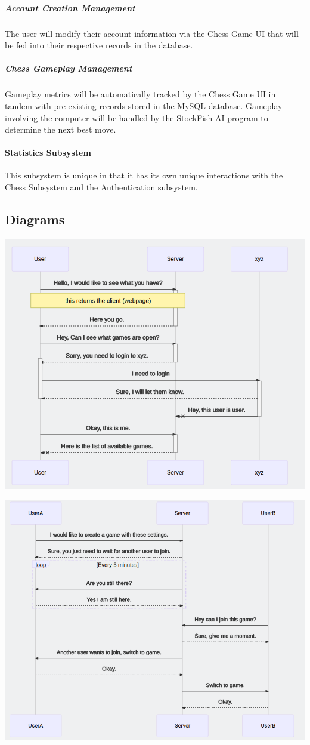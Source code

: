 \subparagraph{Account Creation Management}
The user will modify their account information via the Chess Game UI that will be fed into their respective records in the database.

\subparagraph{Chess Gameplay Management}
Gameplay metrics will be automatically tracked by the Chess Game UI in tandem with pre-existing records stored in the MySQL database. Gameplay involving the computer will be handled by the StockFish AI program to determine the next best move.
\paragraph{Statistics Subsystem}
This subsystem is unique in that it has its own unique interactions with the Chess Subsystem and the Authentication subsystem.

\subsection{Diagrams}
\begin{center}
	\includegraphics[width=.9\linewidth]{../diagrams/out/Sequence1.png}
\end{center}
\begin{center}
	\includegraphics[width=.9\linewidth]{../diagrams/out/Sequence2.png}
\end{center}
